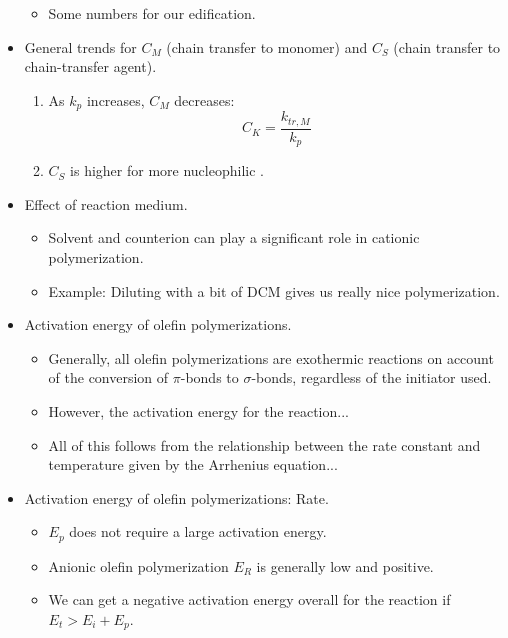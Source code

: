 \documentclass[../notes.tex]{subfiles}
\begin{document}
\begin{itemize}
    \begin{itemize}
        \item Some numbers for our edification.
    \end{itemize}
    \item General trends for $C_M$ (chain transfer to monomer) and $C_S$ (chain transfer to chain-transfer agent).
    \begin{enumerate}
        \item As $k_p$ increases, $C_M$ decreases:
        \begin{equation*}
            C_K = \frac{k_{tr,M}}{k_p}
        \end{equation*}
        \item $C_S$ is higher for more nucleophilic .
    \end{enumerate}
    \item Effect of reaction medium.
    \begin{itemize}
        \item Solvent and counterion can play a significant role in cationic polymerization.
        \item Example: Diluting  with a bit of DCM gives us really nice polymerization.
    \end{itemize}
    \item Activation energy of olefin polymerizations.
    \begin{itemize}
        \item Generally, all olefin polymerizations are exothermic reactions on account of the conversion of $\pi$-bonds to $\sigma$-bonds, regardless of the initiator used.
        \item However, the activation energy for the reaction...
        \item All of this follows from the relationship between the rate constant and temperature given by the Arrhenius equation...
    \end{itemize}
    \item Activation energy of olefin polymerizations: Rate.
    \begin{itemize}
        \item $E_p$ does not require a large activation energy.
        \item Anionic olefin polymerization $E_R$ is generally low and positive.
        \item We can get a negative activation energy overall for the reaction if $E_t>E_i+E_p$.
        \begin{itemize}

\end{itemize}
\end{itemize}
\end{itemize}
\end{document}
